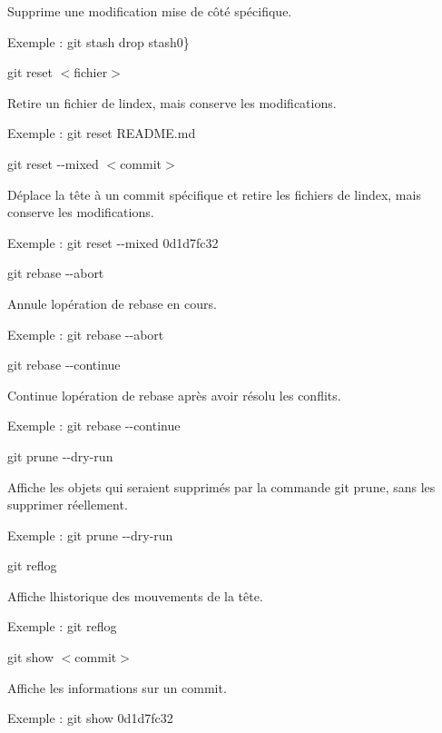 \begin{DoxyEnumerate}
\begin{DoxyItemize}
\item Supprime une modification mise de côté spécifique.
\item Exemple \+: {\ttfamily git stash drop stash0\}}
\end{DoxyItemize}
\item {\ttfamily git reset $<$fichier$>$}
\begin{DoxyItemize}
\item Retire un fichier de l\textquotesingle{}index, mais conserve les modifications.
\item Exemple \+: {\ttfamily git reset R\+E\+A\+D\+M\+E.\+md}
\end{DoxyItemize}
\item {\ttfamily git reset -\/-\/mixed $<$commit$>$}
\begin{DoxyItemize}
\item Déplace la tête à un commit spécifique et retire les fichiers de l\textquotesingle{}index, mais conserve les modifications.
\item Exemple \+: {\ttfamily git reset -\/-\/mixed 0d1d7fc32}
\end{DoxyItemize}
\item {\ttfamily git rebase -\/-\/abort}
\begin{DoxyItemize}
\item Annule l\textquotesingle{}opération de rebase en cours.
\item Exemple \+: {\ttfamily git rebase -\/-\/abort}
\end{DoxyItemize}
\item {\ttfamily git rebase -\/-\/continue}
\begin{DoxyItemize}
\item Continue l\textquotesingle{}opération de rebase après avoir résolu les conflits.
\item Exemple \+: {\ttfamily git rebase -\/-\/continue}
\end{DoxyItemize}
\item {\ttfamily git prune -\/-\/dry-\/run}
\begin{DoxyItemize}
\item Affiche les objets qui seraient supprimés par la commande {\ttfamily git prune}, sans les supprimer réellement.
\item Exemple \+: {\ttfamily git prune -\/-\/dry-\/run}
\end{DoxyItemize}
\item {\ttfamily git reflog}
\begin{DoxyItemize}
\item Affiche l\textquotesingle{}historique des mouvements de la tête.
\item Exemple \+: {\ttfamily git reflog}
\end{DoxyItemize}
\item {\ttfamily git show $<$commit$>$}
\begin{DoxyItemize}
\item Affiche les informations sur un commit.
\item Exemple \+: {\ttfamily git show 0d1d7fc32} 
\end{DoxyItemize}
\end{DoxyEnumerate}